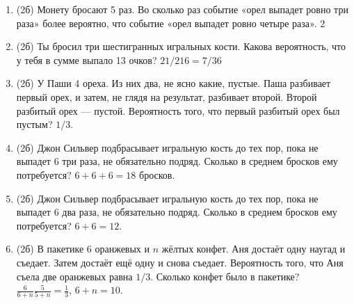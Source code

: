 \documentclass[a4paper, 12pt]{article}
\begin{document}
\begin{enumerate}
\item (2б) Монету бросают 5 раз. Во сколько раз событие «орел выпадет ровно три раза» более вероятно, что событие «орел выпадет ровно четыре раза». $2$
\item (2б) Ты бросил три шестигранных игральных кости. Какова вероятность, что у тебя в сумме выпало 13 очков? $21/216=7/36$
\item (2б) У Паши 4 ореха. Из них два, не ясно какие, пустые. Паша разбивает первый орех, и затем, не глядя на результат, разбивает второй. Второй разбитый орех — пустой. Вероятность того, что первый разбитый орех был пустым? $1/3$.

\item (2б) Джон Сильвер подбрасывает игральную кость до тех пор, пока не выпадет 6 три раза, не обязательно подряд. Сколько в среднем бросков ему потребуется? $6+6+6=18$ бросков.
\item (2б) Джон Сильвер подбрасывает игральную кость до тех пор, пока не выпадет 6 два раза, не обязательно подряд. Сколько в среднем бросков ему потребуется? $6+6=12$.

\item (2б) В пакетике 6 оранжевых и $n$ жёлтых конфет. Аня достаёт одну наугад и съедает. Затем достаёт ещё одну и снова съедает. Вероятность того, что Аня съела две оранжевых равна $1/3$. Сколько конфет было в пакетике? $\frac{6}{6+n}\frac{5}{5+n}=\frac{1}{3}$, $6+n=10$.




\end{enumerate}
\end{document}
